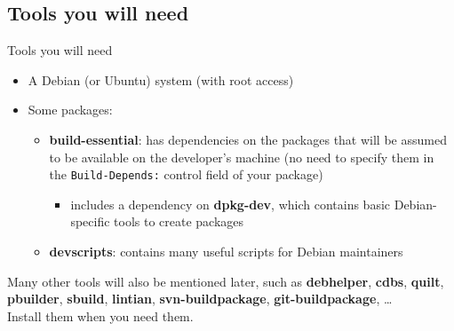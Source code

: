 \documentclass[10pt,final]{beamer}
\begin{document}
\subsection{Tools you will need}
\begin{frame}{Tools you will need}
  \begin{itemize}
  \item A Debian (or Ubuntu) system (with root access)
    \br
  \item Some packages:
    \begin{itemize}
    \item \textbf{build-essential}: has dependencies on the packages that will
      be assumed to be available on the developer's machine (no need to specify
      them in the \texttt{Build-Depends:} control field of your package)
      \begin{itemize}
      \item includes a dependency on \textbf{dpkg-dev}, which contains basic
        Debian-specific tools to create packages
      \end{itemize}
      \hbr
    \item \textbf{devscripts}: contains many useful scripts for Debian
      maintainers
    \end{itemize}
  \end{itemize}

  \br
  Many other tools will also be mentioned later, such as \textbf{debhelper},
  \textbf{cdbs}, \textbf{quilt}, \textbf{pbuilder}, \textbf{sbuild},
  \textbf{lintian}, \textbf{svn-buildpackage}, \textbf{git-buildpackage},
  \ldots\\
  Install them when you need them.
\end{frame}
\end{document}
